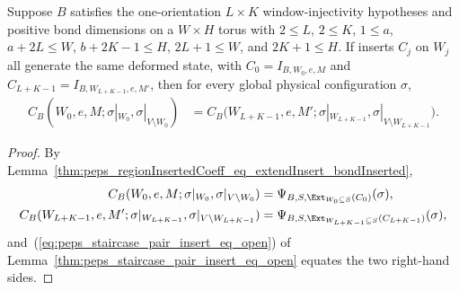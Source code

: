 \begin{lemma}
    \label{thm:peps_regionInsertedCoeff_endWindows_eq_of_staircase}
    \leanok
    Suppose $B$ satisfies the one-orientation $L\times K$ window-injectivity
    hypotheses and positive bond dimensions on a $W\times H$ torus with $2\le L$, $2\le K$, $1\le a$,
    $a+2L\le W$, $b+2K-1\le H$, $2L+1\le W$, and $2K+1\le H$. If inserts $C_j$
    on $W_j$ all generate the same deformed state, with
    $C_0=I_{B,W_0,e,M}$ and $C_{L+K-1}=I_{B,W_{L+K-1},e,M'}$, then for every
    global physical configuration $\sigma$,
    \begin{align}
        C_B(W_0,e,M;\sigma|_{W_0},\sigma|_{V\setminus W_0})
         & =
        C_B\bigl(W_{L+K-1},e,M';
        \sigma|_{W_{L+K-1}},\sigma|_{V\setminus W_{L+K-1}}\bigr).
        \label{eq:peps_single_bond_peeling_coeff}
    \end{align}
\end{lemma}
\begin{proof}\leanok
    By Lemma~\ref{thm:peps_regionInsertedCoeff_eq_extendInsert_bondInserted},
    \begin{align}
        C_B(W_0,e,M;\sigma|_{W_0},\sigma|_{V\setminus W_0})
         & =\Psi_{B,S,\Ext_{W_0\subseteq S}(C_0)}(\sigma),
        \notag                                                         \\
        C_B(W_{L+K-1},e,M';\sigma|_{W_{L+K-1}},\sigma|_{V\setminus W_{L+K-1}})
         & =\Psi_{B,S,\Ext_{W_{L+K-1}\subseteq S}(C_{L+K-1})}(\sigma),
        \notag
    \end{align}
    and~(\ref{eq:peps_staircase_pair_insert_eq_open}) of
    Lemma~\ref{thm:peps_staircase_pair_insert_eq_open} equates the two right-hand sides.
\end{proof}




